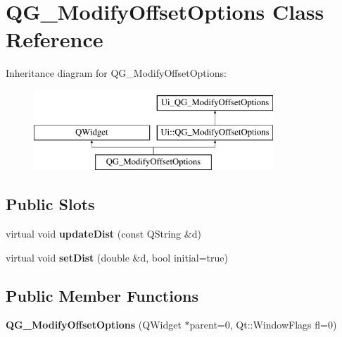 \hypertarget{classQG__ModifyOffsetOptions}{\section{Q\-G\-\_\-\-Modify\-Offset\-Options Class Reference}
\label{classQG__ModifyOffsetOptions}
}
Inheritance diagram for Q\-G\-\_\-\-Modify\-Offset\-Options\-:\begin{figure}[H]
\begin{center}
\leavevmode
\includegraphics[height=3.000000cm]{classQG__ModifyOffsetOptions}
\end{center}
\end{figure}
\subsection*{Public Slots}
\begin{DoxyCompactItemize}
\item 
\hypertarget{classQG__ModifyOffsetOptions_ab0e185e03cf75960b4d13aad17a8dc94}{virtual void {\bfseries update\-Dist} (const Q\-String \&d)}\label{classQG__ModifyOffsetOptions_ab0e185e03cf75960b4d13aad17a8dc94}

\item 
\hypertarget{classQG__ModifyOffsetOptions_a885d51f43fbc0331b916719c6d326a79}{virtual void {\bfseries set\-Dist} (double \&d, bool initial=true)}\label{classQG__ModifyOffsetOptions_a885d51f43fbc0331b916719c6d326a79}

\end{DoxyCompactItemize}
\subsection*{Public Member Functions}
\begin{DoxyCompactItemize}
\item 
\hypertarget{classQG__ModifyOffsetOptions_a198821592135b04eda0592a04fcc78f6}{{\bfseries Q\-G\-\_\-\-Modify\-Offset\-Options} (Q\-Widget $\ast$parent=0, Qt\-::\-Window\-Flags fl=0)}\label{classQG__ModifyOffsetOptions_a198821592135b04eda0592a04fcc78f6}

\end{DoxyCompactItemize}
